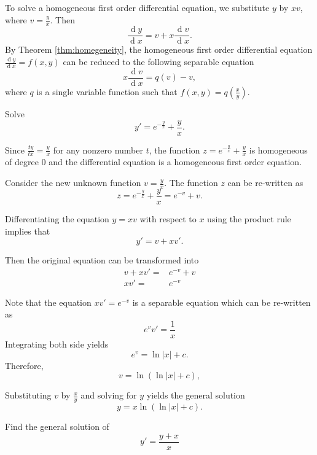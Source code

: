  To solve a homogeneous first order differential equation, we substitute $y$ by $xv$, where $v=\frac{y}{x}$. Then 
 \[\frac{\operatorname{d} y}{\operatorname{d} x}=v+x\frac{\operatorname{d} v}{\operatorname{d} x}.\]
 By Theorem \ref{thm:homegeneity}, the homogeneous first order differential equation $\frac{\operatorname{d} y}{\operatorname{d} x}=f(x, y)$ can be reduced to the following separable equation
 \[x\frac{\operatorname{d} v}{\operatorname{d} x}=q(v)-v,\]
 where $q$ is a single variable function such that $f(x, y)=q(\frac xy)$.

\begin{example}
  Solve 
  \[ y'=e^{-\frac{y}{x}}+ \frac{y}{x}.\]
\end{example}
\begin{solution}
  \begin{steps}
  \item
  Since $\frac{t y}{t x}=\frac yx$ for any nonzero number $t$, the function $z=e^{-\frac{y}{x}}+ \frac{y}{x}$ is homogeneous of degree $0$ and the differential equation is a homogeneous first order equation.
  
  \item
  Consider the new unknown function $v=\frac{y}{x}$. The function $z$ can be re-written as
  \[z=e^{-\frac{y}{x}}+ \frac{y}{x}=e^{-v}+v.\]
  
  \item Differentiating the equation $y=xv$ with respect to $x$ using the product rule implies that
   \[y'=v+xv'.\]

   \item Then the original equation can be transformed into
   \[
     \begin{aligned}
      v+xv'=&e^{-v}+v\\
      xv'=&e^{-v}
     \end{aligned}
  \]

  \item Note that the equation $xv'=e^{-v}$ is a separable equation which can be re-written as
  \[e^{v}v' = \frac{1}{x}\]
  Integrating both side yields
  \[e^{v} = \ln|x| +c.\]
  Therefore, 
  \[v= \ln(\ln |x|+c),\] 

  \item Substituting $v$ by $\frac{x}{y}$ and solving for $y$ yields the general solution
  \[y = x  \ln(\ln |x|+c).\]
\end{steps}
\end{solution}

\begin{exercise}
  Find the general solution of
  \[
  y'  =  \frac{y+x}{x}
  \]
\end{exercise}

